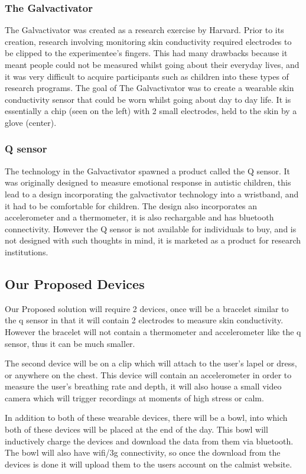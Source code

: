 \documentclass{scrartcl}
\begin{document}
\subsubsection{The Galvactivator}
The Galvactivator was created as a research exercise by Harvard. Prior to its creation,
research involving monitoring skin conductivity required electrodes to be clipped to the
experimentee's fingers. This had many drawbacks because it meant people could not be measured
whilst going about their everyday lives, and it was very difficult to acquire participants
such as children into these types of research programs. The goal of The Galvactivator was to
create a wearable skin conductivity sensor that could be worn whilst going about day to day
life. It is essentially a chip (seen on the left) with 2 small electrodes, held to the skin
by a glove (center). 

\subsubsection{Q sensor}
The technology in the Galvactivator spawned a product called the Q sensor. It was originally 
designed to measure emotional response in autistic children, this lead to a design incorporating
the galvactivator technology into a wristband, and it had to be comfortable for children. The
design also incorporates an accelerometer and a thermometer, it is also rechargable and has
bluetooth connectivity. However the Q sensor is not available for individuals to buy, and is
not designed with such thoughts in mind, it is marketed as a product for research institutions.

\subsection{Our Proposed Devices}
Our Proposed solution will require 2 devices, once will be a bracelet similar to the q sensor in
that it will contain 2 electrodes to measure skin conductivity. However the bracelet will not
contain a thermometer and accelerometer like the q sensor, thus it can be much smaller.

The second device will be on a clip which will attach to the user's lapel or dress, or anywhere
on the chest. This device will contain an accelerometer in order to measure the user's breathing
rate and depth, it will also house a small video camera which will trigger recordings at 
moments of high stress or calm.

In addition to both of these wearable devices, there will be a bowl, into which both of these
devices will be placed at the end of the day. This bowl will inductively charge the devices and
download the data from them via bluetooth. The bowl will also have wifi/3g connectivity, so once
the download from the devices is done it will upload them to the users account on the calmist
website.
\end{document}
